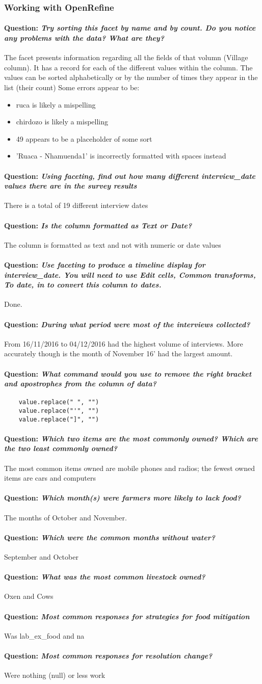 \documentclass[12pt]{article}
\newcounter{problem} \setcounter{problem}{1}
\newcommand{\question}[1]{\paragraph{Question: {\textnormal{\textit{#1}}} ~\\}}
\begin{document}
\subsubsection{Working with OpenRefine}
\question{Try sorting this facet by name and by count. Do you notice any problems with the data? What are they?}
The facet presents information regarding all the fields of that volumn (Village column). It has a record for each of the different values within the column. The values can be sorted alphabetically or by the number of times they appear in the list (their count)
\newline
Some errors appear to be:
\begin{itemize}
    \item ruca is likely a mispelling
    \item chirdozo is likely a mispelling
    \item 49 appears to be a placeholder of some sort
    \item 'Ruaca - Nhamuenda1' is incorrectly formatted with spaces instead
\end{itemize}

\question{Using faceting, find out how many different interview\_date values there are in the survey results}
There is a total of 19 different interview dates
\question{Is the column formatted as Text or Date?}
The column is formatted as text and not with numeric or date values
\question{Use faceting to produce a timeline display for interview\_date. You will need to use Edit cells, Common transforms, To date, in to convert this column to dates.}
Done.
\question{During what period were most of the interviews collected?}
From 16/11/2016 to 04/12/2016 had the highest volume of interviews. More accurately though is the month of November 16' had the largest amount.
\question{What command would you use to remove the right bracket and apostrophes from the column of data?}
\begin{verbatim}
    value.replace(" ", "")
    value.replace("'", "")
    value.replace("]", "")
\end{verbatim}
\question{Which two items are the most commonly owned? Which are the two least commonly owned?}
The most common items owned are mobile phones and radios; the fewest owned items are cars and computers
\question{Which month(s) were farmers more likely to lack food?}
The months of October and November.
\question{Which were the common months without water?}
September and October
\question{What was the most common livestock owned?}
Oxen and Cows
\question{Most common responses for strategies for food mitigation}
Was lab\_ex\_food and na
\question{Most common responses for resolution change?}
Were nothing (null) or less work
\end{document}

